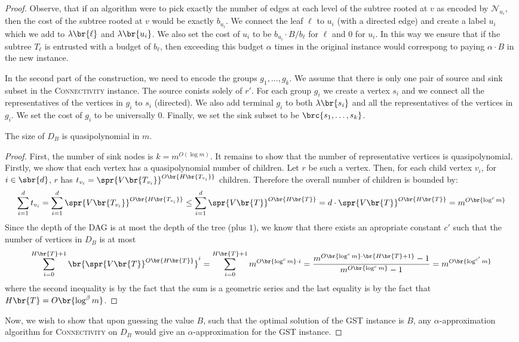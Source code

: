 \begin{proof}
    Observe, that if an algorithm were to pick exactly the number of edges at each level of the subtree rooted at $v$ as encoded by $\mathcal{N}_{u_i}$, then the cost of the subtree rooted at $v$ would be exactly $b_{u_i}$. We connect the leaf $\ell$ to $u_i$ (with a directed edge) and create a label $u_i$ which we add to $\lambda\br{\ell}$ and $\lambda\br{u_i}$. We also set the cost of $u_i$ to be $b_{u_i}\cdot B/b_{\ell}$ for $\ell$ and $0$ for $u_i$. In this way we ensure that if the subtree $T_{\ell}$ is entrusted with a budget of $b_{\ell}$, then exceeding this budget $\alpha$ times in the original instance would correspong to paying $\alpha\cdot B$ in the new instance.
    
    In the second part of the construction, we need to encode the groups $g_1, \dots, g_k$. We assume that there is only one pair of source and sink subset in the \textsc{Connectivity} instance. The source conists solely of $r'$. For each group $g_i$ we create a vertex $s_i$ and we connect all the representatives of the vertices in $g_i$ to $s_i$ (directed). We also add terminal $g_i$ to both $\lambda\br{s_i}$ and all the representatives of the vertices in $g_i$. We set the cost of $g_i$ to be universally $0$. Finally, we set the sink subset to be $\brc{s_1, \dots, s_k}$.
    \begin{lemma}
        The size of $D_B$ is quasipolynomial in $m$.
    \end{lemma}
    \begin{proof}
        First, the number of sink nodes is $k = m^{O(\log m)}$. It remains to show that the number of representative vertices is quasipolynomial. Firstly, we show that each vertex has a quasipolynomial number of children. Let $r$ be such a vertex. Then, for each child vertex $v_i$, for $i\in\sbr{d}$, $r$ has $t_{v_i}=\spr{V\br{T_{v_i}}}^{O\br{H\br{T_{v_i}}}}$ children. Therefore the overall number of children is bounded by:
        \[
            \sum_{i=1}^{d} t_{v_i} = \sum_{i=1}^{d} \spr{V\br{T_{v_i}}}^{O\br{H\br{T_{v_i}}}} \leq \sum_{i=1}^{d} \spr{V\br{T}}^{O\br{H\br{T}}} = d\cdot \spr{V\br{T}}^{O\br{H\br{T}}} = m^{O\br{\log^c m}}
        \]
        Since the depth of the DAG is at most the depth of the tree (plus $1$), we know that there exists an apropriate constant $c'$ such that the number of vertices in $D_B$ is at most \[
            \sum_{i=0}^{H\br{T}+1} \br{\spr{V\br{T}}^{O\br{H\br{T}}}}^i = \sum_{i=0}^{H\br{T}+1} m^{O\br{\log^c m}\cdot i}  = \frac{m^{O\br{\log^c m}\cdot \br{H\br{T}+1}} - 1}{m^{O\br{\log^c m}} - 1} = m^{O\br{\log^{c'} m}}
        \]
        where the second inequality is by the fact that the sum is a geometric series and the last equality is by the fact that $H\br{T}=O\br{\log^{\beta}{m}}$.
    \end{proof}
    Now, we wish to show that upon guessing the value $B$, such that the optimal solution of the \textsc{GST} instance is $B$, any $\alpha$-approximation algorithm for \textsc{Connectivity} on $D_B$ would give an $\alpha$-approximation for the \textsc{GST} instance. 
        

\end{proof}
